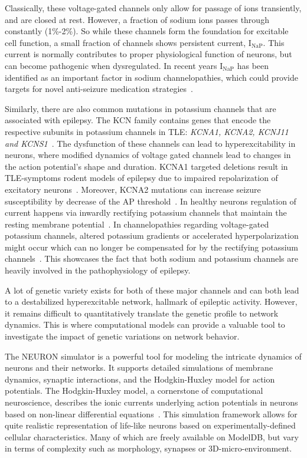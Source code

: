 Classically, these voltage-gated channels only allow for passage of ions transiently, and are closed at rest.
However, a fraction of sodium ions passes through constantly (1\%-2\%).
So while these channels form the foundation for excitable cell function, a small fraction of channels shows persistent current, \(\text{I}_{\text{NaP}}\).
This current is normally contributes to proper physiological function of neurons, but can become pathogenic when dysregulated.
In recent years \(\text{I}_{\text{NaP}}\) has been identified as an important factor in sodium channelopathies, which could provide targets for novel anti-seizure medication strategies~\parencite{wengertRolePersistentSodium2021}.

Similarly, there are also common mutations in potassium channels that are associated with epilepsy.
The KCN family contains genes that encode the respective subunits in potassium channels in TLE\@: \textit{KCNA1, KCNA2, KCNJ11 and KCNS1}~\parencite{gaoPotassiumChannelsEpilepsy2022,zhangIdentificationKeyPotassium2023}.
The dysfunction of these channels can lead to hyperexcitability in neurons, where modified dynamics of voltage gated channels lead to changes in the action potential's shape and duration.
KCNA1 targeted deletions result in TLE-symptoms rodent models of epilepsy due to impaired repolarization of excitatory neurons~\parencite{eunsonClinicalGeneticExpression2000}.
Moreover, KCNA2 mutations can increase seizure susceptibility by decrease of the AP threshold~\parencite{liuRescuingKv10Protein2020}.
In healthy neurons regulation of current happens via inwardly rectifying potassium channels that maintain the resting membrane potential~\parencite{isomotoInwardlyRectifyingPotassium1997}.
In channelopathies regarding voltage-gated potassium channels, altered potassium gradients or accelerated hyperpolarization might occur which can no longer be compensated for by the rectifying
potassium channels~\parencite{nikitinPotassiumChannelsProminent2021}. This showcases the fact that both sodium and potassium channels are heavily involved in the pathophysiology of epilepsy.

A lot of genetic variety exists for both of these major channels and can both lead to a destabilized hyperexcitable network, hallmark of epileptic activity.
However, it remains difficult to quantitatively translate the genetic profile to network dynamics.
This is where computational models can provide a valuable tool to investigate the impact of genetic variations on network behavior.

The NEURON simulator is a powerful tool for modeling the intricate dynamics
of neurons and their networks. It supports detailed simulations of membrane
dynamics, synaptic interactions, and the Hodgkin-Huxley model for action
potentials. The Hodgkin-Huxley model, a cornerstone of computational neuroscience,
describes the ionic currents underlying action potentials in neurons based
on non-linear differential equations~\parencite{hodgkinMeasurementCurrentvoltageRelations1952}.
This simulation framework allows for quite realistic representation of life-like neurons based
on experimentally-defined cellular characteristics. Many of which are freely available on ModelDB,
but vary in terms of complexity such as morphology, synapses or 3D-micro-environment.

